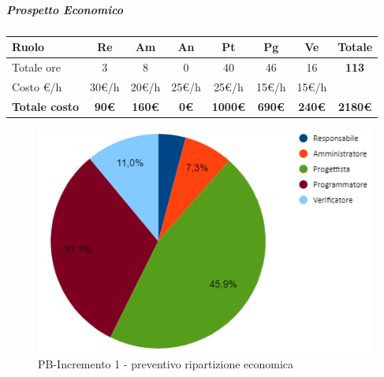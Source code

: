 \subparagraph{Prospetto Economico}
\begin{center}
	\renewcommand{\arraystretch}{1.8} %
	\begin{tabular}{ |m{10em}|c|c|c|c|c|c|c| }
	\hline
	\textbf{Ruolo} & \textbf{Re} & \textbf{Am} &  \textbf{An} &  \textbf{Pt} &  \textbf{Pg} &  \textbf{Ve} &  \textbf{Totale}\\
    \hline
    Totale ore & 3 & 8 & 0 & 40 & 46 & 16 & \textbf{113}\\
    \hline
    Costo \euro/h & 30\euro/h & 20\euro/h & 25\euro/h & 25\euro/h & 15\euro/h & 15\euro/h & \\
    \hline
    \textbf{Totale costo} & \textbf{90\euro} & \textbf{160\euro} &  \textbf{0\euro} &  \textbf{1000\euro} &  \textbf{690\euro} &  \textbf{240\euro} &  \textbf{2180\euro}\\
    \hline
	\end{tabular}

    \begin{figure}[H]
       \centering\includegraphics{images/preventivo/PB-incremento1-costo.png}
       \caption{PB-Incremento 1 - preventivo ripartizione economica}
    \end{figure}
\end{center}




